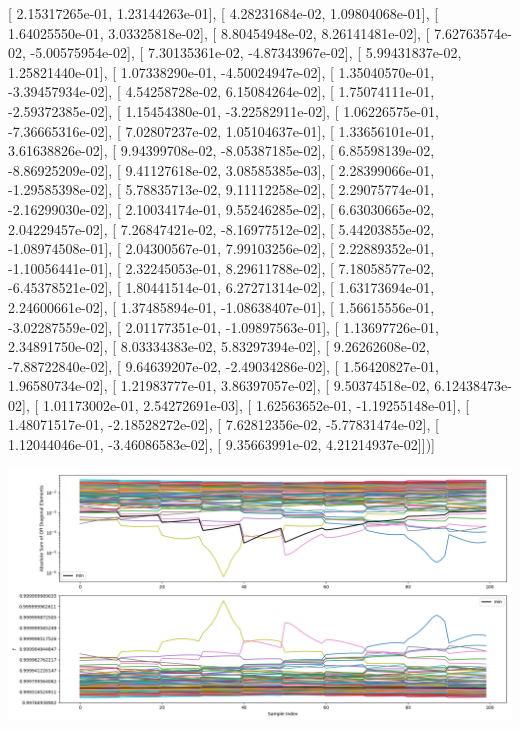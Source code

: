 \documentclass{article}
\begin{document}
       [  2.15317265e-01,   1.23144263e-01],
       [  4.28231684e-02,   1.09804068e-01],
       [  1.64025550e-01,   3.03325818e-02],
       [  8.80454948e-02,   8.26141481e-02],
       [  7.62763574e-02,  -5.00575954e-02],
       [  7.30135361e-02,  -4.87343967e-02],
       [  5.99431837e-02,   1.25821440e-01],
       [  1.07338290e-01,  -4.50024947e-02],
       [  1.35040570e-01,  -3.39457934e-02],
       [  4.54258728e-02,   6.15084264e-02],
       [  1.75074111e-01,  -2.59372385e-02],
       [  1.15454380e-01,  -3.22582911e-02],
       [  1.06226575e-01,  -7.36665316e-02],
       [  7.02807237e-02,   1.05104637e-01],
       [  1.33656101e-01,   3.61638826e-02],
       [  9.94399708e-02,  -8.05387185e-02],
       [  6.85598139e-02,  -8.86925209e-02],
       [  9.41127618e-02,   3.08585385e-03],
       [  2.28399066e-01,  -1.29585398e-02],
       [  5.78835713e-02,   9.11112258e-02],
       [  2.29075774e-01,  -2.16299030e-02],
       [  2.10034174e-01,   9.55246285e-02],
       [  6.63030665e-02,   2.04229457e-02],
       [  7.26847421e-02,  -8.16977512e-02],
       [  5.44203855e-02,  -1.08974508e-01],
       [  2.04300567e-01,   7.99103256e-02],
       [  2.22889352e-01,  -1.10056441e-01],
       [  2.32245053e-01,   8.29611788e-02],
       [  7.18058577e-02,  -6.45378521e-02],
       [  1.80441514e-01,   6.27271314e-02],
       [  1.63173694e-01,   2.24600661e-02],
       [  1.37485894e-01,  -1.08638407e-01],
       [  1.56615556e-01,  -3.02287559e-02],
       [  2.01177351e-01,  -1.09897563e-01],
       [  1.13697726e-01,   2.34891750e-02],
       [  8.03334383e-02,   5.83297394e-02],
       [  9.26262608e-02,  -7.88722840e-02],
       [  9.64639207e-02,  -2.49034286e-02],
       [  1.56420827e-01,   1.96580734e-02],
       [  1.21983777e-01,   3.86397057e-02],
       [  9.50374518e-02,   6.12438473e-02],
       [  1.01173002e-01,   2.54272691e-03],
       [  1.62563652e-01,  -1.19255148e-01],
       [  1.48071517e-01,  -2.18528272e-02],
       [  7.62812356e-02,  -5.77831474e-02],
       [  1.12044046e-01,  -3.46086583e-02],
       [  9.35663991e-02,   4.21214937e-02]])]
\begin{center}
\includegraphics[scale=.9]{report_pickled_controls113/control_dpn_all.png}

\end{center}
\end{document}
